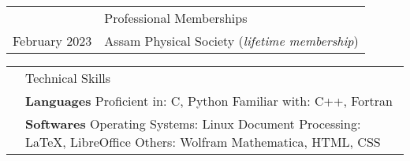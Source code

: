 \documentclass[a4paper, 11pt]{article}
\newcommand{\headingfont}{\Large\color{Bittersweet}}
\newenvironment{SectionTable}[1]{
	\renewcommand*{\arraystretch}{1.7}
	\setlength{\tabcolsep}{10pt}
	\begin{longtable}{Rp{5.2in}} & #1 \\}
{\end{longtable}\vspace{-.3cm}}
\begin{document}
























\begin{SectionTable}{\headingfont Professional Memberships}
February 2023  &
Assam Physical Society (\textit{lifetime membership}) \\

\end{SectionTable}


\begin{SectionTable}{\headingfont Technical Skills}
& \textbf{Languages} \newline
Proficient in: C, Python \newline
Familiar with: C++, Fortran \\

& \textbf{Softwares} \newline
Operating Systems: Linux \newline
Document Processing: \LaTeX , LibreOffice\newline
Others:  Wolfram Mathematica, HTML, CSS \\

\end{SectionTable}
\end{document}
